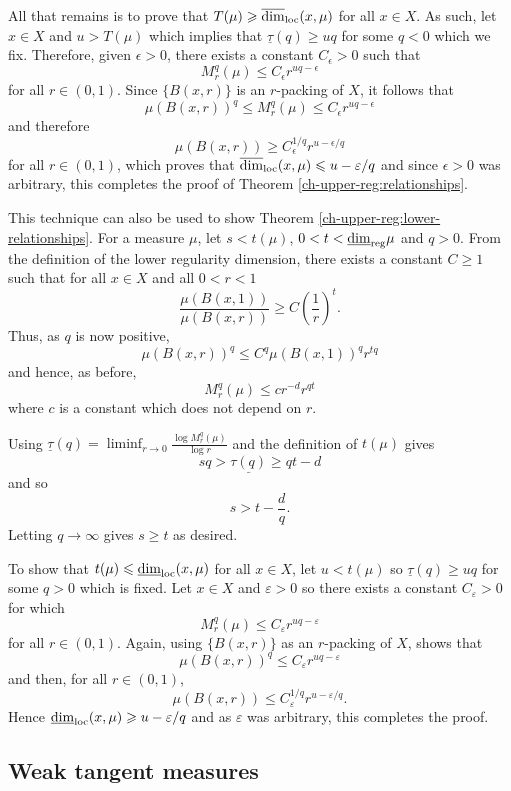 All that remains is to prove that $T(\mu) \geqslant \overline{\dim}_{\textup{loc}}(x,\mu)$ for all $x \in X$.  As such, let $x \in X$ and $u>T(\mu)$ which implies that $\underline{\tau}(q)  \geq  uq$ for some $q<0$ which we fix.  Therefore, given $\epsilon>0$, there exists a constant $C_\epsilon>0$ such that
\[
M_r^q(\mu) \leq C_\epsilon r^{uq-\epsilon}
\]
for all $r \in (0,1)$.  Since $\{ B(x,r)\}$ is an $r$-packing of $X$, it follows that
\[
\mu(B(x,r))^q \le M_r^q(\mu) \leq C_\epsilon r^{uq-\epsilon}
\]
and therefore
\[
\mu(B(x,r)) \ge  C_\epsilon^{1/q} r^{u-\epsilon/q}
\]
for all $r\in (0,1)$, which proves that $\overline{\dim}_{\textup{loc}}(x,\mu) \leqslant u-\varepsilon/q$ and since $\epsilon>0$ was arbitrary, this completes the proof of Theorem \ref{ch-upper-reg:relationships}.

This technique can also be used to show Theorem \ref{ch-upper-reg:lower-relationships}. For a measure $\mu$, let $s < t(\mu)$, $0 < t < \underline{\dim}_{\textup{reg}} \mu$ and $q > 0$. From the definition of the lower regularity dimension, there exists a constant $C \ge 1$ such that for all $x\in X$ and all $0<r<1$
\[
\frac{\mu(B(x,1))}{\mu(B(x,r))} \ge C \left( \frac{1}{r}\right)^t.
\]
Thus, as $q$ is now positive,
\[
\mu(B(x,r))^q \le C^q \mu(B(x,1))^q r^{tq}
\]
and hence, as before,
\[
M_r^q(\mu) \le cr^{-d}r^{qt}
\]
where $c$ is a constant which does not depend on $r$.

Using $\underline{\tau}(q) = \liminf_{r \rightarrow 0} \frac{\log M_r^q(\mu)}{\log r}$ and the definition of $t(\mu)$ gives
\[
sq > \underline{\tau(q)} \ge qt - d
\]
and so
\[
s> t-\frac{d}{q}.
\]
Letting $q \rightarrow \infty$ gives $s \ge t$ as desired.

To show that $t(\mu) \leqslant \underline{\dim}_{\textup{loc}}(x,\mu)$ for all $x \in X$, let $u < t(\mu)$ so $\underline{\tau}(q) \ge uq$ for some $q > 0$ which is fixed. Let $ x \in X$ and $\varepsilon > 0$ so there exists a constant $C_{\varepsilon} > 0$ for which
\[
M_r^q(\mu) \le C_\varepsilon r^{uq - \varepsilon}
\]
for all $r \in (0,1)$. Again, using $\{B(x,r) \}$ as an $r$-packing of $X$, shows that
\[
\mu(B(x,r))^q \le C_\varepsilon r^{uq - \varepsilon}
\]
and then, for all $r \in (0,1)$,
\[
\mu(B(x,r)) \le C_\varepsilon^{1/q} r^{u-\varepsilon/q}.
\]
Hence $\underline{\dim}_{\textup{loc}}(x,\mu) \geqslant u -\varepsilon / q$ and as $\varepsilon$ was arbitrary, this completes the proof.




\subsection{Weak tangent measures} \label{ch-upper-reg:weaktangentsproof}

